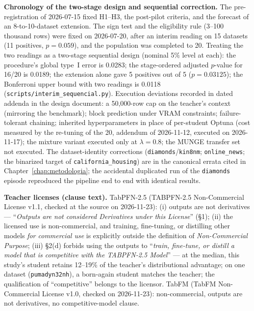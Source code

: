 \textbf{Chronology of the two-stage design and sequential
correction.} The pre-registration of 2026-07-15 fixed H1--H3, the
post-pilot criteria, and the forecast of an 8-to-10-dataset
extension. The sign test and the eligibility rule (3--100 thousand
rows) were fixed on 2026-07-20, after an interim reading on 15
datasets (11 positives, $p=0.059$), and the population was completed
to 20. Treating the two readings as a two-stage sequential design
(nominal 5\% level at each): the procedure's global type~I error is
0.0283; the stage-ordered adjusted $p$-value for 16/20 is 0.0189;
the extension alone gave 5 positives out of 5 ($p=0.03125$); the
Bonferroni upper bound with two readings is 0.0118
(\texttt{scripts/\allowbreak interim\_\allowbreak sequencial.py}).
Execution deviations recorded in dated addenda in the design
document: a 50{,}000-row cap on the teacher's context (mirroring the
benchmark); block prediction under VRAM constraints; failure-tolerant
chaining; inherited hyperparameters in place of per-student Optuna
(cost measured by the re-tuning of the 20, addendum of 2026-11-12,
executed on 2026-11-17); the mixture variant executed only at
$\lambda{=}0.8$; the MUNGE transfer set not executed. The
dataset-identity corrections (\texttt{diamonds}/\texttt{kin8nm};
\texttt{online\_news}; the binarized target of
\texttt{california\_housing}) are in the canonical errata cited in
Chapter~\ref{chap:metodologia}; the accidental duplicated run of the
\texttt{diamonds} episode reproduced the pipeline end to end with
identical results.

\textbf{Teacher licenses (clause text).} TabPFN-2.5 (TABPFN-2.5
Non-Commercial License v1.1, checked at the source on 2026-11-23):
(i) outputs are not derivatives --- ``\emph{Outputs are not
considered Derivatives under this License}'' (\S1); (ii) the
licensed use is non-commercial, and training, fine-tuning, or
distilling other models \emph{for commercial use} is explicitly
outside the definition of \emph{Non-Commercial Purpose}; (iii)
\S2(d) forbids using the outputs to ``\emph{train, fine-tune, or
distill a model that is competitive with the TABPFN-2.5 Model}'' ---
at the median, this study's student retains 12--19\% of the
teacher's distributional
advantage; on one dataset (\texttt{pumadyn32nh}), a born-again
student matches the teacher; the qualification of ``competitive''
belongs to the licensor. TabFM (TabFM
Non-Commercial License v1.0, checked on 2026-11-23): non-commercial,
outputs are not derivatives, no competitive-model clause.

